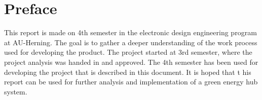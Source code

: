 \section*{Preface}
This report is made on 4th semester in the electronic design engineering program at AU-Herning. The goal is to gather a deeper understanding of the work process used for developing the product. The project started at 3rd semester, where the project analysis was handed in and approved. The 4th semester has been used for developing the project that is described in this document. It is hoped that t his report can be used for further analysis and implementation of a green energy hub system.